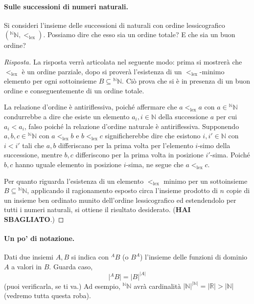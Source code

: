 \documentclass[fontsize = 11 pt, paper=A4, oneside, index=totoc, hyperref]{article}
\theoremstyle{definition}
\theoremstyle{plain}
\newcommand{\N}{\mathbb{N}}
\begin{document}
\paragraph{Sulle successioni di numeri naturali.} Si consideri l'insieme delle successioni di naturali con ordine lessicografico \(({}^\N\N, <_{\mathrm{lex}})\). Possiamo dire che esso sia un ordine totale? E che sia un buon ordine?
\begin{proof}[Risposta]
  La risposta verrà articolata nel seguente modo: prima si mostrerà che \(<_{\mathrm{lex}}\) è un ordine parziale, dopo si proverà l'esistenza di un \(<_{\mathrm{lex}}\)-minimo elemento per ogni sottoinsieme \(B \subseteq {}^\N\N\). Ciò prova che si è in presenza di un buon ordine e conseguentemente di un ordine totale.

  La relazione d'ordine è antiriflessiva, poiché affermare che \(a <_{\mathrm{lex}} a\) con \(a \in {}^\N\N\) condurrebbe a dire che esiste un elemento \(a_i, i \in \N\) della successione \(a\) per cui \(a_i < a_i\), falso poiché la relazione d'ordine naturale è antiriflessiva. Supponendo \(a,b,c \in {}^\N\N\) con \(a <_{\mathrm{lex}} b\) e \(b <_{\mathrm{lex}} c\) significherebbe dire che esistono \(i,i' \in \N\) con \(i < i'\) tali che \(a,b\) differiscano per la prima volta per l'elemento \(i\)-simo della successione, mentre \(b,c\) differiscono per la prima volta in posizione \(i'\)-sima. Poiché \(b,c\) hanno uguale elemento in posizione \(i\)-sima, ne segue che \(a <_{\mathrm{lex}} c\).

  Per quanto riguarda l'esistenza di un elemento \(<_{\mathrm{lex}}\) minimo per un sottoinsieme \(B \subseteq {}^\N\N\), applicando il ragionamento esposto circa l'insieme prodotto di \(n\) copie di un insieme ben ordinato munito dell'ordine lessicografico ed estendendolo per tutti i numeri naturali, si ottiene il risultato desiderato. ({\bf HAI SBAGLIATO}.)
\end{proof}

\paragraph{Un po' di notazione.} Dati due insiemi \(A,B\) si indica con \({}^AB\) (o \(B^A\)) l'insieme delle funzioni di dominio \(A\) a valori in \(B\). Guarda caso,
\[
\lvert {}^AB\rvert = \lvert B \rvert^{\lvert A \rvert}
\]
(puoi verificarla, se ti va.) Ad esempio, \({}^\N\N\) avrà cardinalità \(\lvert\N\rvert^{\lvert\N\lvert} = \lvert\mathbb{R}\rvert > \lvert\N\rvert\) (vedremo tutta questa roba).
\end{document}
